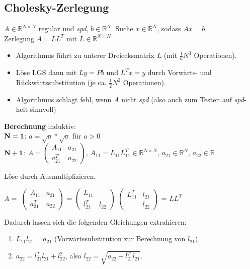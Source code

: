 \documentclass[a4paper]{article}
\begin{document}
\subsection{Cholesky-Zerlegung}

$ A \in \mathbb{R}^{N \times N} $ regulär und \emph{spd}, $b \in \mathbb{R}^N$.
Suche $ x \in \mathbb{R}^{N} $, sodass $Ax=b$.
\\
Zerlegung $A = LL^T$ mit $L \in \mathbb{R}^{N \times N}$.

\begin{itemize}
    \item Algorithmus führt zu unterer Dreiecksmatrix $L$
    (mit $\frac{1}{6}N^3$ Operationen).
    \item Löse LGS dann mit $Ly = Pb$ und $L^Tx = y$ durch Vorwärts- und
    Rückwärtssubstitution (je ca. $\frac{1}{2}N^2$ Operationen).
    \item Algorithmus schlägt fehl, wenn $A$ nicht \emph{spd} (also auch zum
    Testen auf \emph{spd}-heit sinnvoll)
\end{itemize}

\textbf{Berechnung} induktiv:
\\
$\bf{N = 1}$: $a = \sqrt{a}*\sqrt{a}$ für $a > 0$
\\
$\bf{N + 1}$: $A = 
\begin{pmatrix}
    A_{11}   & a_{21} \\
    a_{21}^T & a_{22}
\end{pmatrix}$,
$A_{11} = L_{11}L_{11}^T \in \mathbb{R}^{N \times N}$,
$a_{21} \in \mathbb{R}^{N}$,
$a_{22} \in \mathbb{R}$

\vspace{1em}
Löse durch Ausmultiplizieren.
\vspace{1em}

$A = $
$\begin{pmatrix}
    A_{11}   & a_{21} \\
    a_{21}^T & a_{22}
\end{pmatrix}$
=
$\begin{pmatrix}
    L_{11}   &  \\
    l_{21}^T & l_{22}
\end{pmatrix}$
$\begin{pmatrix}
    L_{11}^T & l_{21} \\
             & l_{22}
\end{pmatrix}$
=
$LL^T$

\vspace{1em}

Dadurch lassen sich die folgenden Gleichungen extrahieren:
\begin{enumerate}
    \item $L_{11}l_{21} = a_{21}$
    (Vorwärtssubstitution zur Berechnung von $l_{21}$).
    \item $a_{22} = l_{21}^T l_{21} + l_{22}^2$,
    also $l_{22} = \sqrt{a_{22} - l_{21}^T l_{21}}$.
\end{enumerate}
\end{document}
